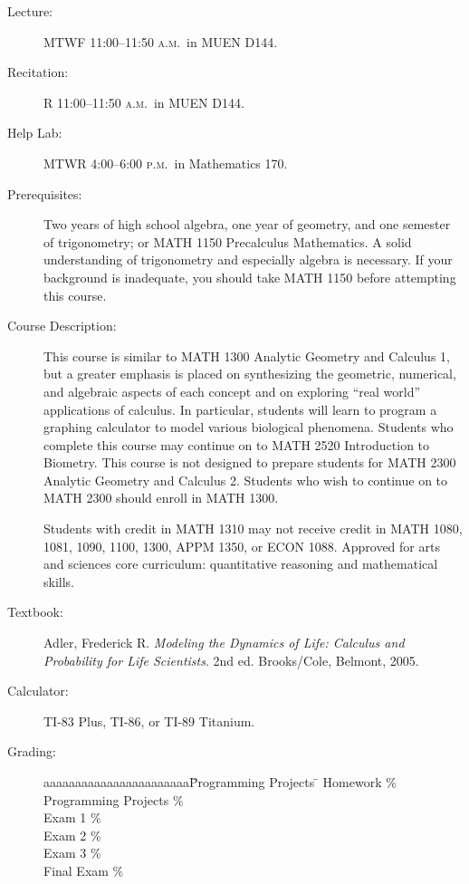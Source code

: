 \documentclass[11pt]{article}
\newcommand{\AM}{\textsc{a.m.}}
\newcommand{\PM}{\textsc{p.m.}}
\newcommand{\book}[1]{\textit{#1}}
\begin{document}
\begin{description}
\item[Lecture:] MTWF 11:00--11:50 \AM\ in MUEN D144.

\item[Recitation:] R 11:00--11:50 \AM\ in MUEN D144.

\item[Help Lab:] MTWR 4:00--6:00 \PM\ in Mathematics 170.

\item[Prerequisites:]
Two years of high school algebra, one year of geometry, and one semester of trigonometry; or MATH 1150 Precalculus Mathematics. A solid understanding of trigonometry and especially algebra is necessary. If your background is inadequate, you should take MATH 1150 before attempting this course.

\item[Course Description:]
This course is similar to MATH 1300 Analytic Geometry and Calculus 1, but a greater emphasis is placed on synthesizing the geometric, numerical, and algebraic aspects of each concept and on exploring ``real world'' applications of calculus. In particular, students will learn to program a graphing calculator to model various biological phenomena. Students who complete this course may continue on to MATH 2520 Introduction to Biometry. This course is not designed to prepare students for MATH 2300 Analytic Geometry and Calculus 2. Students who wish to continue on to MATH 2300 should enroll in MATH 1300.

Students with credit in MATH 1310 may not receive credit in MATH 1080, 1081, 1090, 1100, 1300, APPM 1350, or ECON 1088. Approved for arts and sciences core curriculum: quantitative reasoning and mathematical skills.

\item[Textbook: ]
Adler, Frederick R. \book{Modeling the Dynamics of Life: Calculus and Probability for Life Scientists}. 2nd ed. Brooks/Cole, Belmont, 2005.

\item[Calculator: ]
TI-83 Plus, TI-86, or TI-89 Titanium. 

\item[Grading: ]
\begin{tabbing}
aaaaaaaaaaaaaaaaaaaaaaa\quad    \= Programming Projects \quad  \=    \kill
\> Homework  \%    \\
\> Programming Projects  \%    \\
\> Exam 1  \% \\
\> Exam 2  \% \\
\> Exam 3  \% \\
\> Final Exam \% \\ 
\end{tabbing}


\end{description}
\end{document}

